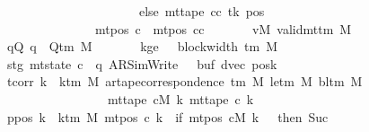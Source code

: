 \begin{isabellebody}
\ \ \ \ \ \ \ \ \ \ \ \ \ \ \ \ \ \ \ \ \ \ \ \ \ \ \ \ else\ mt{\isacharunderscore}{\kern0pt}tape\ cc\ tk{\isacharprime}{\kern0pt}\ pos{\isacharparenright}{\kern0pt}{\isacharparenright}{\kern0pt}{\isacharparenright}{\kern0pt}\isanewline
\ \ \ \ \ \ \ \ \ \ \ \ \ \ \ \ \ \ \ \ {\isasymand}\ mt{\isacharunderscore}{\kern0pt}pos\ c{\isacharprime}{\kern0pt}{\isacharprime}{\kern0pt}\ {\isacharequal}{\kern0pt}\ mt{\isacharunderscore}{\kern0pt}pos\ cc{\isachardoublequoteclose}\isanewline
\ \ \ \ \ \ \ vM{\isacharcolon}{\kern0pt}\ {\isachardoublequoteopen}valid{\isacharunderscore}{\kern0pt}mttm\ M{\isachardoublequoteclose}\isanewline
\ \ \ \ \ \ \ qQ{\isacharcolon}{\kern0pt}\ {\isachardoublequoteopen}q\ {\isasymin}\ Q{\isacharunderscore}{\kern0pt}tm\ M{\isachardoublequoteclose}\isanewline
\ \ \ \ \ \ \ kge{}{\isacharcolon}{\kern0pt}\ {\isachardoublequoteopen}{}\ {\isasymle}\ block{\isacharunderscore}{\kern0pt}width\ {\isacharparenleft}{\kern0pt}{\isasymGamma}{\isacharunderscore}{\kern0pt}tm\ M{\isacharparenright}{\kern0pt}{\isachardoublequoteclose}\isanewline
\ \ \ \ \ \ \ stg{}{\isacharcolon}{\kern0pt}\ {\isachardoublequoteopen}mt{\isacharunderscore}{\kern0pt}state\ c{}\ {\isacharequal}{\kern0pt}\ {\isacharparenleft}{\kern0pt}q{\isacharcomma}{\kern0pt}\ AR{\isacharunderscore}{\kern0pt}SimWrite{\isacharcomma}{\kern0pt}\ {}{\isacharcomma}{\kern0pt}\ {}{\isacharcomma}{\kern0pt}\ buf{\isacharcomma}{\kern0pt}\ dvec{\isacharcomma}{\kern0pt}\ posk{\isacharparenright}{\kern0pt}{\isachardoublequoteclose}\isanewline
\ \ \ \ \ \ \ tcorr{\isacharcolon}{\kern0pt}\ {\isachardoublequoteopen}{\isasymforall}k\ {\isacharless}{\kern0pt}\ k{\isacharunderscore}{\kern0pt}tm\ M{\isachardot}{\kern0pt}\ ar{\isacharunderscore}{\kern0pt}tape{\isacharunderscore}{\kern0pt}correspondence\ {\isacharparenleft}{\kern0pt}{\isasymGamma}{\isacharunderscore}{\kern0pt}tm\ M{\isacharparenright}{\kern0pt}\ {\isacharparenleft}{\kern0pt}le{\isacharunderscore}{\kern0pt}tm\ M{\isacharparenright}{\kern0pt}\ {\isacharparenleft}{\kern0pt}bl{\isacharunderscore}{\kern0pt}tm\ M{\isacharparenright}{\kern0pt}\isanewline
\ \ \ \ \ \ \ \ \ \ \ \ \ \ \ \ \ \ \ \ \ \ \ {\isacharparenleft}{\kern0pt}mt{\isacharunderscore}{\kern0pt}tape\ cM\ k{\isacharparenright}{\kern0pt}\ {\isacharparenleft}{\kern0pt}mt{\isacharunderscore}{\kern0pt}tape\ c{}\ k{\isacharparenright}{\kern0pt}{\isachardoublequoteclose}\isanewline
\ \ \ \ \ \ \ ppos{\isacharcolon}{\kern0pt}\ {\isachardoublequoteopen}{\isasymforall}k\ {\isacharless}{\kern0pt}\ k{\isacharunderscore}{\kern0pt}tm\ M{\isachardot}{\kern0pt}\ mt{\isacharunderscore}{\kern0pt}pos\ c{}\ k\ {\isacharequal}{\kern0pt}\ {\isacharparenleft}{\kern0pt}if\ mt{\isacharunderscore}{\kern0pt}pos\ cM\ k\ {\isacharequal}{\kern0pt}\ {}\ then\ Suc\ {}\isanewline

\end{isabellebody}
